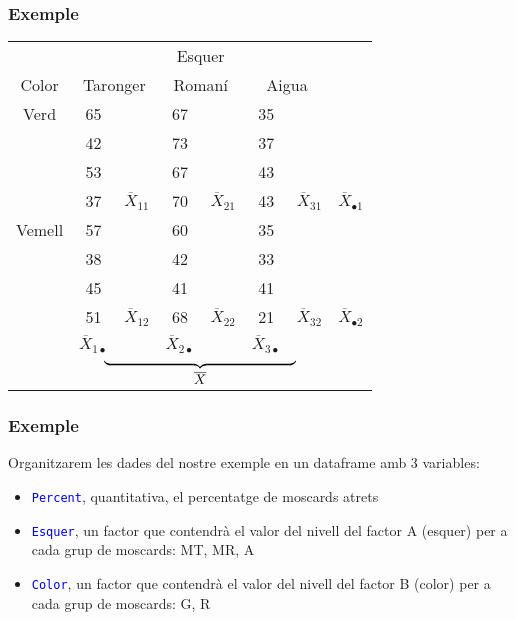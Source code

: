 \documentclass[12pt,t]{beamer}
\newcommand{\blue}[1]{\textcolor{blue}{#1}}
\theoremstyle{plain}
\theoremstyle{definition}
\begin{document}
\begin{frame}
\frametitle{Exemple} 

\begin{center}
\begin{tabular}{c|cc|cc|cc|c}
\multicolumn{1}{c}{ }&\multicolumn{6}{c}{Esquer}\\\cline{2-7}
Color &\multicolumn{2}{|c|}{Taronger}& \multicolumn{2}{|c|}{Romaní} & \multicolumn{2}{|c|}{Aigua} & \\\hline
Verd &65 & & 67 & & 35 &  \\
&42& &73& &37& \\
& 53  && 67 & & 43& \\
&37&  \hspace*{-0.5cm} $\overline{X}_{11}$& 70&  \hspace*{-0.5cm} $\overline{X}_{21}$& 43&  \hspace*{-0.7cm} $\overline{X}_{31}$ & $\overline{X}_{\bullet 1}$\\\hline
Vemell & 57  & &60&& 35 & \\
 & 38&& 42&& 33&\\
 &45 && 41&& 41 &\\
 & 51&  \hspace*{-0.5cm} $\overline{X}_{12}$& 68&  \hspace*{-0.5cm} $\overline{X}_{22}$& 21&  \hspace*{-0.7cm} $\overline{X}_{32}$& $\overline{X}_{\bullet2}$ \\\hline
\vphantom{$\Big($} & $\overline{X}_{1\bullet}$ & & $\overline{X}_{2\bullet}$ & & $\overline{X}_{3\bullet}$ & \\
 \multicolumn{1}{c}{}& \multicolumn{6}{c}{$\underbrace{\hphantom{\overline{X}_{11}+\overline{X}_{11}+\overline{X}_{11}+\overline{X}_{11}+\overline{X}_{11}}}_{\displaystyle \overline{X}}$} & \multicolumn{1}{c}{}
 \end{tabular}
\end{center}

\end{frame}



\begin{frame}
\frametitle{Exemple} 

Organitzarem les dades del nostre exemple en un dataframe  amb 3 variables:
\medskip

\begin{itemize}
\item \blue{{\tt Percent}}, quantitativa, el percentatge de moscards atrets\medskip

\item \blue{{\tt Esquer}}, un factor que  contendrà el valor del nivell  del  factor
A (esquer) per a cada grup de moscards: MT, MR, A
\medskip

\item \blue{{\tt Color}}, un factor que   contendrà el valor del nivell del  factor
B (color) per a cada grup de moscards: G, R
\end{itemize}
\end{frame}
\end{document}
